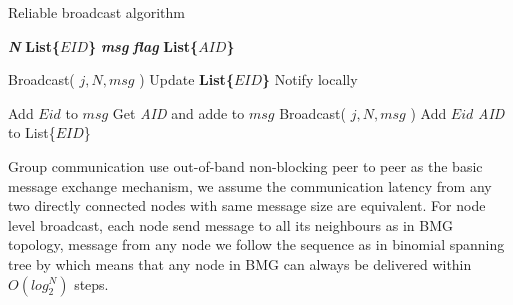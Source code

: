 \documentclass[sigconf]{acmart}
\begin{document}
\begin{algorithm}
\caption{Reliable broadcast algorithm }
\textbf{\textit{N}} \newline
\textbf{List\{$EID$\}} \newline
\textbf{\textit{msg}} \newline
\textbf{\textit{flag}} \newline
\textbf{List\{$AID$\}} \newline

\begin{algorithmic}[1]
\EndFor
\EndProcedure
\end{algorithmic}

\begin{algorithmic}[1]
    \State Broadcast( $j, N, msg$ )
    \State Update \textbf{List\{$EID$\}}
    \State Notify locally
\EndIf
\EndProcedure
\end{algorithmic}

\begin{algorithmic}[1]
    \State Add $Eid$ to $msg$
    \State Get \textit{AID} and adde to $msg$
    \State Broadcast( $j, N, msg$ )
    \State Add $Eid$ \textit{AID} to List\{$EID$\}
\EndIf
\EndProcedure
\end{algorithmic}

\end{algorithm}

Group communication use out-of-band non-blocking peer to peer as the basic message exchange mechanism, we assume the communication latency from any two directly connected nodes with same message size are equivalent. For node level broadcast, each node send message to all its neighbours  as in BMG topology, message from any node we follow the sequence as in binomial spanning tree by which means that any node in BMG can always be delivered within $O(log_2^N)$ steps. 
\end{document}
